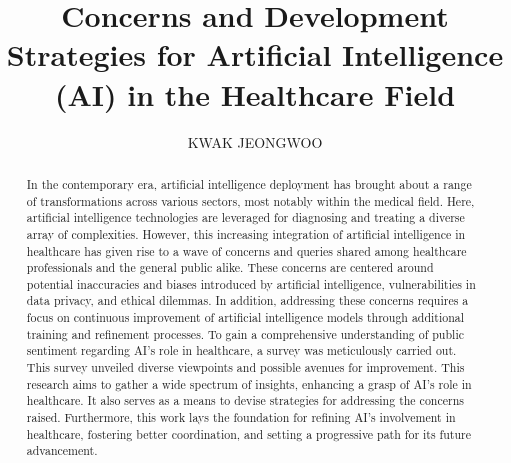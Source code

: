 \documentclass{ieeeaccess}
\begin{document}



\title{Concerns and Development Strategies for Artificial Intelligence (AI) in the Healthcare Field}
\author{\uppercase{KWAK JEONGWOO }}


\address{17-4, Yeoksam-ro 3-gil, Gangnam-gu,  Seoul, Republic of Korea}



\begin{abstract}
In the contemporary era, artificial intelligence deployment has brought about a range of transformations across various sectors, most notably within the medical field. Here, artificial intelligence technologies are leveraged for diagnosing and treating a diverse array of complexities. However, this increasing integration of artificial intelligence in healthcare has given rise to a wave of concerns and queries shared among healthcare professionals and the general public alike. These concerns are centered around potential inaccuracies and biases introduced by artificial intelligence, vulnerabilities in data privacy, and ethical dilemmas. In addition, addressing these concerns requires a focus on continuous improvement of artificial intelligence models through additional training and refinement processes. To gain a comprehensive understanding of public sentiment regarding AI's role in healthcare, a survey was meticulously carried out. This survey unveiled diverse viewpoints and possible avenues for improvement. This research aims to gather a wide spectrum of insights, enhancing a grasp of AI's role in healthcare. It also serves as a means to devise strategies for addressing the concerns raised. Furthermore, this work lays the foundation for refining AI's involvement in healthcare, fostering better coordination, and setting a progressive path for its future advancement.
\end{abstract}
\end{document}
